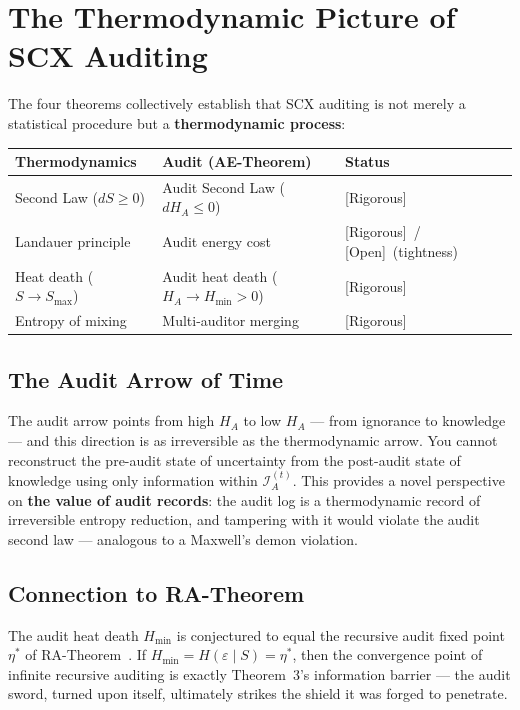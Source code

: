 \documentclass[12pt,a4paper]{article}
\newcommand{\rigorous}{\textcolor{green!50!black}{\small\textsf{[Rigorous]}}}
\newcommand{\openquest}{\textcolor{red!70!black}{\small\textsf{[Open]}}}
\newcommand{\cI}{\mathcal{I}}
\begin{document}
\section{The Thermodynamic Picture of SCX Auditing}

The four theorems collectively establish that SCX auditing is not merely a
statistical procedure but a \textbf{thermodynamic process}:

\begin{center}
\begin{tabular}{@{}lll@{}}
\toprule
\textbf{Thermodynamics} & \textbf{Audit (AE-Theorem)} & \textbf{Status} \\
\midrule
Second Law ($dS\geq0$) & Audit Second Law ($dH_A\leq0$) & \rigorous \\
Landauer principle & Audit energy cost & \rigorous~/ \openquest~(tightness) \\
Heat death ($S\to S_{\max}$) & Audit heat death ($H_A\to H_{\min}>0$) & \rigorous \\
Entropy of mixing & Multi-auditor merging & \rigorous \\
\bottomrule
\end{tabular}
\end{center}

\subsection{The Audit Arrow of Time}

The audit arrow points from high $H_A$ to low $H_A$ — from ignorance to
knowledge — and this direction is as irreversible as the thermodynamic arrow.
You cannot reconstruct the pre-audit state of uncertainty from the post-audit
state of knowledge using only information within $\cI_A^{(t)}$.  This provides
a novel perspective on \textbf{the value of audit records}: the audit log is a
thermodynamic record of irreversible entropy reduction, and tampering with it
would violate the audit second law — analogous to a Maxwell's demon violation.

\subsection{Connection to RA-Theorem}

The audit heat death $H_{\min}$ is conjectured to equal the recursive audit
fixed point $\eta^*$ of RA-Theorem~\citep{scx2024ra}.  If
$H_{\min}=H(\varepsilon\mid S)=\eta^*$, then the convergence point of infinite
recursive auditing is exactly Theorem~3's information barrier — the audit sword,
turned upon itself, ultimately strikes the shield it was forged to penetrate.
\end{document}
